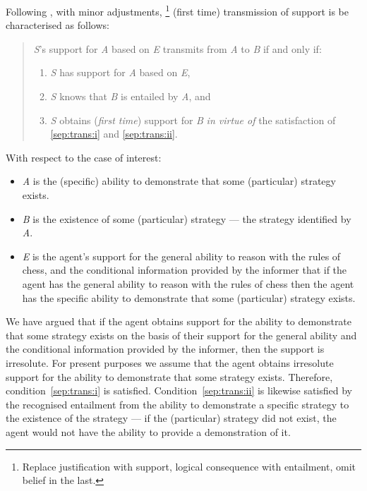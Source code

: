 \documentclass[10pt]{article}
\begin{document}
\begin{note}
  Following \textcite{Moretti:2018we}, with minor adjustments,\nolinebreak
  \footnote{
    Replace justification with support, logical consequence with entailment, omit belief in the last.
  }
  (first time) transmission of support is be characterised as follows:
  \begin{quote}
    \emph{S}'s support for \emph{A} based on \emph{E} transmits from \emph{A} to \emph{B} if and only if:
    \begin{enumerate}[label=(\roman*), ref=(\roman*)]
    \item\label{sep:trans:i} \emph{S} has support for \emph{A} based on \emph{E},
    \item\label{sep:trans:ii} \emph{S} knows that \emph{B} is entailed by \emph{A}, and
    \item\label{sep:trans:iii} \emph{S} obtains (\emph{first time}) support for \emph{B} \emph{in virtue of} the satisfaction of \ref{sep:trans:i} and \ref{sep:trans:ii}.
    \end{enumerate}
  \end{quote}
  With respect to the case of interest:
  \begin{itemize}
  \item \emph{A} is the (specific) ability to demonstrate that some (particular) strategy exists.
  \item \emph{B} is the existence of some (particular) strategy --- the strategy identified by \emph{A}.
  \item \emph{E} is the agent's support for the general ability to reason with the rules of chess, and the conditional information provided by the informer that if the agent has the general ability to reason with the rules of chess then the agent has the specific ability to demonstrate that some (particular) strategy exists.
  \end{itemize}
  We have argued that if the agent obtains support for the ability to demonstrate that some strategy exists on the basis of their support for the general ability and the conditional information provided by the informer, then the support is irresolute.
  For present purposes we assume that the agent obtains irresolute support for the ability to demonstrate that some strategy exists.
  Therefore, condition~\ref{sep:trans:i} is satisfied.
  Condition~\ref{sep:trans:ii} is likewise satisfied by the recognised entailment from the ability to demonstrate a specific strategy to the existence of the strategy --- if the (particular) strategy did not exist, the agent would not have the ability to provide a demonstration of it.


\end{note}
\end{document}
